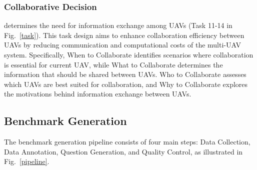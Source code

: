 \documentclass[letterpaper]{article} %
\begin{document}
\subsubsection{Collaborative Decision} determines the need for information exchange among UAVs (Task 11-14 in Fig.~\ref{task}). 
This task design aims to enhance collaboration efficiency between UAVs by reducing communication and computational costs of the multi-UAV system. 
Specifically, When to Collaborate identifies scenarios where collaboration is essential for current UAV, while What to Collaborate determines the information that should be shared between UAVs. Who to Collaborate assesses which UAVs are best suited for collaboration, and Why to Collaborate explores the motivations behind information exchange between UAVs. 


\subsection{Benchmark Generation}
The benchmark generation pipeline consists of four main steps: Data Collection, Data Annotation, Question Generation, and Quality Control, as illustrated in Fig.~\ref{pipeline}.
\end{document}
